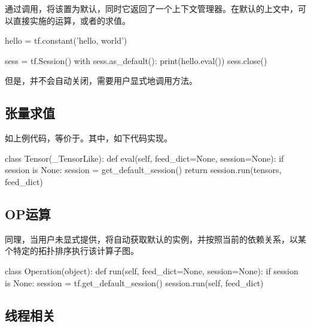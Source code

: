 \begin{content}

通过调用，将该置为默认，同时它返回了一个上下文管理器。在默认的上文中，可以直接实施的运算，或者的求值。

\begin{leftbar}
\begin{python}
hello = tf.constant('hello, world')

sess = tf.Session()  
with sess.as_default():
  print(hello.eval())
sess.close()
\end{python}
\end{leftbar}

但是，并不会自动关闭，需要用户显式地调用方法。

\subsection{张量求值}

如上例代码，等价于。其中，如下代码实现。

\begin{leftbar}
\begin{python}
class Tensor(_TensorLike):
  def eval(self, feed_dict=None, session=None):
    if session is None:
      session = get_default_session()
    return session.run(tensors, feed_dict)
\end{python}
\end{leftbar}

\subsection{OP运算}

同理，当用户未显式提供，将自动获取默认的实例，并按照当前的依赖关系，以某个特定的拓扑排序执行该计算子图。

\begin{leftbar}
\begin{python}
class Operation(object):
  def run(self, feed_dict=None, session=None):
    if session is None:
      session = tf.get_default_session()
    session.run(self, feed_dict)
\end{python}
\end{leftbar}

\subsection{线程相关}


\end{content}
